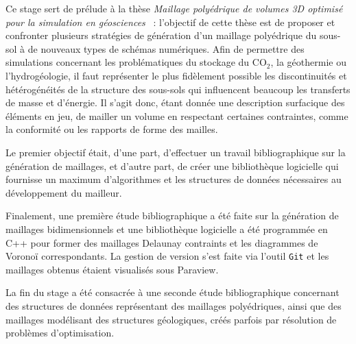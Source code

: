 \documentclass[12pt]{article}
\begin{document}
\resume

Ce stage sert de prélude à la thèse \og \emph{Maillage polyédrique de volumes 3D optimisé pour la simulation en géosciences} \fg{}~: l'objectif de cette thèse est de proposer et confronter plusieurs stratégies de génération d'un maillage polyédrique du sous-sol à de nouveaux types de schémas numériques. Afin de permettre des simulations concernant les problématiques du stockage du CO$_2$, la géothermie ou l'hydrogéologie, il faut représenter le plus fidèlement possible les discontinuités et hétérogénéités de la structure des sous-sols qui influencent beaucoup les transferts de masse et d'énergie. Il s'agit donc, étant donnée une description surfacique des éléments en jeu, de mailler un volume en respectant certaines contraintes, comme la conformité ou les rapports de forme des mailles.
\vspace{1cm}

Le premier objectif était, d'une part, d'effectuer un travail bibliographique sur la génération de maillages, et d'autre part, de créer une bibliothèque logicielle qui fournisse un maximum d'algorithmes et les structures de données nécessaires au développement du mailleur.

\vspace{1cm}

Finalement, une première étude bibliographique a été faite sur la génération de maillages bidimensionnels et une bibliothèque logicielle a été programmée en C++ pour former des maillages Delaunay contraints et les diagrammes de Voronoï correspondants. La gestion de version s'est faite via l'outil \verb+Git+ et les maillages obtenus étaient visualisés sous Paraview.

\vspace{1cm}
La fin du stage a été consacrée à une seconde étude bibliographique concernant des structures de données représentant des maillages polyédriques, ainsi que des maillages modélisant des structures géologiques, créés parfois par résolution de problèmes d'optimisation.
\end{document}
